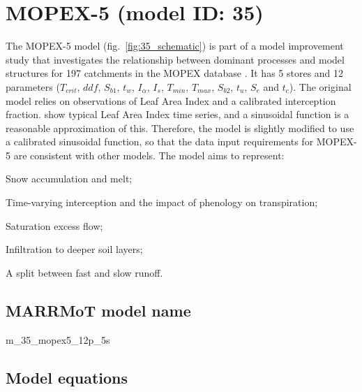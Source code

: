 \section{MOPEX-5 (model ID: 35)}
The MOPEX-5 model (fig.~\ref{fig:35_schematic}) is part of a model improvement study that investigates the relationship between dominant processes and model structures for 197 catchments in the MOPEX database \citep{Ye2012}. It has 5 stores and 12 parameters ($T_{crit}$, $ddf$, $S_{b1}$, $t_w$, $I_{\alpha}$, $I_{s}$, $T_{min}$, $T_{max}$, $S_{b2}$, $t_u$, $S_e$ and $t_c$). The original model relies on observations of Leaf Area Index and a calibrated interception fraction. \citet{Liang1994} show typical Leaf Area Index time series, and a sinusoidal function is a reasonable approximation of this. Therefore, the model is slightly modified to use a calibrated sinusoidal function, so that the data input requirements for MOPEX-5 are consistent with other models.  The model aims to represent:

\begin{itemizecompact}
\item Snow accumulation and melt;
\item Time-varying interception and the impact of phenology on transpiration;
\item Saturation excess flow;
\item Infiltration to deeper soil layers;
\item A split between fast and slow runoff.
\end{itemizecompact}

\subsection{MARRMoT model name}
m\_35\_mopex5\_12p\_5s \\

\subsection{Model equations}

